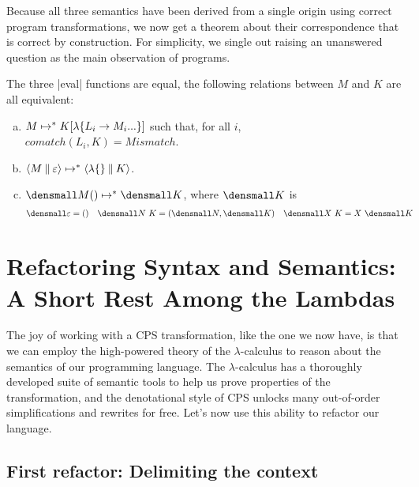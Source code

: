 \documentclass[sigplan,screen]{acmart}
\begin{document}
Because all three semantics have been derived from a single origin using correct
program transformations, we now get a theorem about their correspondence that is
correct by construction.  For simplicity, we single out raising an unanswered
question as the main observation of programs.
\begin{theorem}
\label{thm:block-semantic-correspondence}

The three \hs|eval| functions are equal, \ie the following relations between $M$
and $K$ are all equivalent:
\begin{enumerate}[(a)]
\item $M \mapsto^* K[\lambda\{L_i \to M_i\overset{{}_{}}{...}\}]$ such that, for all $i$, \\
  $\mathit{comatch}(L_i,K) = \mathit{Mismatch}$.
\item $\braket{M \mathbin{\|} \varepsilon} \mapsto^* \braket{\lambda\{\} \mathbin{\|} K}$.
\item $\den{M}() \mapsto^* \den{K}$, where $\den{K}$ is
  \begin{align*}
    \den{\varepsilon} &= ()
    &
    \den{N~K} &= (\den{N}, \den{K})
    &
    \den{X~K} &= X~\den{K}
  \end{align*}
\end{enumerate}
\end{theorem}

\section{Refactoring Syntax and Semantics: A Short Rest Among the Lambdas}
\label{sec:refactor}

The joy of working with a CPS transformation, like the one we now have, is that
we can employ the high-powered theory of the $\lambda$-calculus to reason about
the semantics of our programming language.  The $\lambda$-calculus has a
thoroughly developed suite of semantic tools to help us prove properties of the
transformation, and the denotational style of CPS unlocks many out-of-order
simplifications and rewrites for free.  Let's now use this ability to refactor
our language.

\subsection{First refactor: Delimiting the context}
\end{document}
